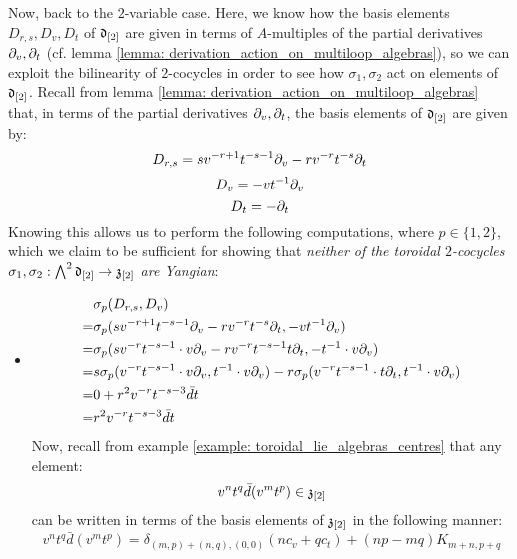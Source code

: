 \begin{example}
            Now, back to the $2$-variable case. Here, we know how the basis elements $D_{r, s}, D_v, D_t$ of $\mathfrak{d}_{[2]}$ are given in terms of $A$-multiples of the partial derivatives $\partial_v, \partial_t$ (cf. lemma \ref{lemma: derivation_action_on_multiloop_algebras}), so we can exploit the bilinearity of $2$-cocycles in order to see how $\sigma_1, \sigma_2$ act on elements of $\mathfrak{d}_{[2]}$. Recall from lemma \ref{lemma: derivation_action_on_multiloop_algebras} that, in terms of the partial derivatives $\partial_v, \partial_t$, the basis elements of $\mathfrak{d}_{[2]}$ are given by:
                $$D_{r, s} = s v^{-r + 1} t^{-s - 1} \partial_v - r v^{-r} t^{-s} \partial_t$$
                $$D_v = -v t^{-1} \partial_v$$
                $$D_t = -\partial_t$$
            Knowing this allows us to perform the following computations, where $p \in \{1, 2\}$, which we claim to be sufficient for showing that \textit{neither of the toroidal $2$-cocycles $\sigma_1, \sigma_2: \bigwedge^2 \mathfrak{d}_{[2]} \to \mathfrak{z}_{[2]}$ are Yangian}:
            \begin{itemize}
                \item
                    $$
                        \begin{aligned}
                            & \sigma_p(D_{r, s}, D_v)
                            \\
                            = & \sigma_p( s v^{-r + 1} t^{-s - 1} \partial_v - r v^{-r} t^{-s} \partial_t, -v t^{-1} \partial_v )
                            \\
                            = & \sigma_p( s v^{-r} t^{-s - 1} \cdot v \partial_v - r v^{-r} t^{-s - 1} t \partial_t, -t^{-1} \cdot v \partial_v )
                            \\
                            = & s \sigma_p( v^{-r} t^{-s - 1} \cdot v \partial_v, t^{-1} \cdot v \partial_v ) - r\sigma_p( v^{-r} t^{-s - 1} \cdot t \partial_t, t^{-1} \cdot v \partial_v )
                            \\
                            = & 0 + r^2 v^{-r} t^{-s - 3} \bar{d}t  
                            \\
                            = & r^2 v^{-r} t^{-s - 3} \bar{d}t
                        \end{aligned}
                    $$
                Now, recall from example \ref{example: toroidal_lie_algebras_centres} that any element:
                    $$v^n t^q \bar{d}(v^m t^p) \in \mathfrak{z}_{[2]}$$
                can be written in terms of the basis elements of $\mathfrak{z}_{[2]}$ in the following manner:
                    $$v^n t^q \bar{d}(v^m t^p) = \delta_{(m, p) + (n, q), (0, 0)} ( n c_v + q c_t ) + (np - mq) K_{m + n, p + q}$$

\end{itemize}
\end{example}
